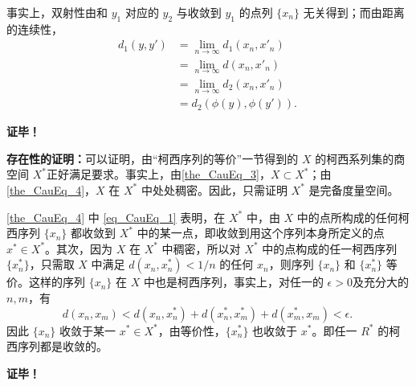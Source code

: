事实上，双射性由和 $y_1$ 对应的 $y_2$ 与收敛到 $y_1$ 的点列 $\{x_n\}$ 无关得到；而由距离的连续性，
\begin{equation}
\begin{aligned}
d_1(y,y')&=\lim_{n\rightarrow\infty} d_1(x_n,x'_n)\\
&=\lim_{n\rightarrow\infty} d(x_n,x'_n)\\
&=\lim_{n\rightarrow\infty} d_2(x_n,x'_n)\\
&=d_2(\phi(y),\phi(y')).
\end{aligned}~
\end{equation}

\textbf{证毕！}

\textbf{存在性的证明：}可以证明，由“柯西序列的等价”一节得到的 $X$ 的柯西系列集的商空间 $X^*$正好满足要求。事实上，由\autoref{the_CauEq_3}，$X\subset X^*$；由\autoref{the_CauEq_4}，$X$ 在 $X^*$ 中处处稠密。因此，只需证明 $X^*$ 是完备度量空间。

\autoref{the_CauEq_4} 中 \autoref{eq_CauEq_1} 表明，在 $X^*$ 中，由 $X$ 中的点所构成的任何柯西序列 $\{x_n\}$ 都收敛到 $X^*$ 中的某一点，即收敛到用这个序列本身所定义的点 $x^*\in X^*$。其次，因为 $X$ 在 $X^*$ 中稠密，所以对 $X^*$ 中的点构成的任一柯西序列 $\{x_n^*\}$，只需取 $X$ 中满足 $d(x_n,x_n^*)<1/n$ 的任何 $x_n$，则序列 $\{x_n\}$ 和 $\{x_n^*\}$ 等价。这样的序列 $\{x_n\}$ 在 $X$ 中也是柯西序列，事实上，对任一的 $\epsilon>0$及充分大的 $n,m$，有
\begin{equation}
d(x_n,x_m)<d(x_n,x_n^*)+d(x_n^*,x_m^*)+d(x_m^*,x_m)<\epsilon.~
\end{equation}
因此 $\{x_n\}$ 收敛于某一 $x^*\in X^*$，由等价性，$\{x_n^*\}$ 也收敛于 $x^*$。即任一 $R^*$ 的柯西序列都是收敛的。

\textbf{证毕！}